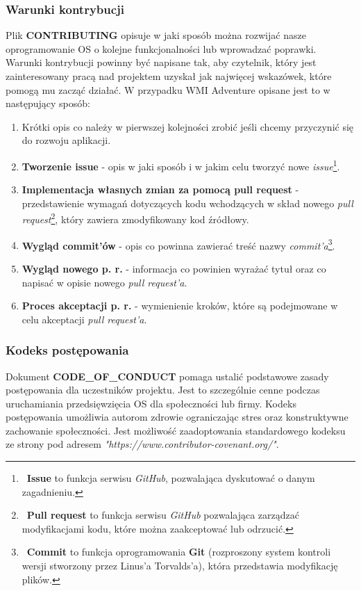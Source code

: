 \documentclass{article}
\begin{document}
\subsubsection{Warunki kontrybucji}

\hspace{4mm} Plik \textbf{CONTRIBUTING} opisuje w jaki sposób można rozwijać nasze oprogramowanie OS o kolejne funkcjonalności lub wprowadzać poprawki. Warunki kontrybucji powinny być napisane tak, aby czytelnik, który jest zainteresowany pracą nad projektem uzyskał jak najwięcej wskazówek, które pomogą mu zacząć działać. W przypadku WMI Adventure opisane jest to w następujący sposób:
\begin{enumerate}
    \item Krótki opis co należy w pierwszej kolejności zrobić jeśli chcemy przyczynić się do rozwoju aplikacji.
    \item \textbf{Tworzenie issue} - opis w jaki sposób i w jakim celu tworzyć nowe \emph{issue}\footnote{\, \textbf{Issue} to funkcja serwisu \emph{GitHub}, pozwalająca dyskutować o danym zagadnieniu.}.
    \item \textbf{Implementacja własnych zmian za pomocą pull request} -\newline przedstawienie wymagań dotyczących kodu wchodzących w skład nowego \emph{pull request}\footnote{\, \textbf{Pull request} to funkcja serwisu \emph{GitHub} pozwalająca zarządzać modyfikacjami kodu, które można zaakceptować lub odrzucić.}, który zawiera zmodyfikowany kod źródłowy.
    \item \textbf{Wygląd commit'ów} - opis co powinna zawierać treść nazwy \emph{commit'a}\footnote{\, \textbf{Commit} to funkcja oprogramowania \textbf{Git} (rozproszony system kontroli wersji stworzony przez Linus'a Torvalds'a\cite{git.wiki}), która przedstawia modyfikację plików.}.
    \item \textbf{Wygląd nowego p. r.} - informacja co powinien wyrażać tytuł oraz co napisać w opisie nowego \emph{pull request'a}.
    \item \textbf{Proces akceptacji p. r.} - wymienienie kroków, które są podejmowane w celu akceptacji \emph{pull request'a}.
\end{enumerate}

\subsubsection{Kodeks postępowania}

\hspace{4mm} Dokument \textbf{CODE\_OF\_CONDUCT} pomaga ustalić podstawowe zasady postępowania dla uczestników projektu. Jest to szczególnie cenne podczas uruchamiania przedsięwzięcia OS dla społeczności lub firmy. Kodeks postępowania umożliwia autorom zdrowie ograniczając stres oraz konstruktywne zachowanie społeczności\cite{opensource.guide}. Jest możliwość zaadoptowania standardowego kodeksu ze strony pod adresem \emph{"https://www.contributor-covenant.org/"}\cite{contributor.covenant}.
\end{document}
